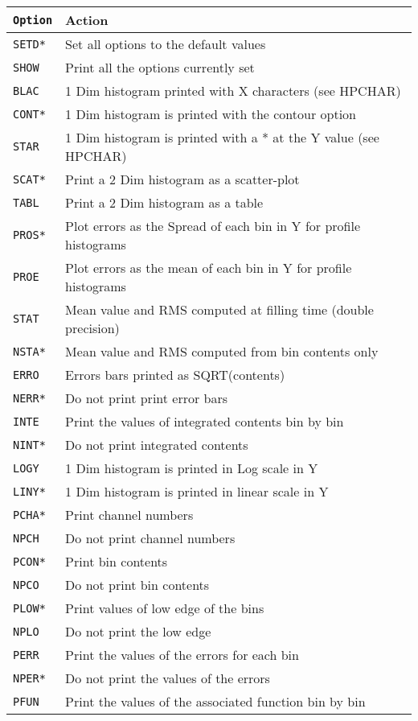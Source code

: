 \begin{Tabhere}
\begin{center}
\begin{tabular}{|>{\tt}l|p{10cm}|}
\hline {\rm\bf Option}&{\bf Action}\\ \hline
SETD*&Set all options to the default values \\
SHOW &Print all the options currently set \\
BLAC &1 Dim histogram printed with X characters (see HPCHAR) \\
CONT*&1 Dim histogram is printed with the contour option \\
STAR &1 Dim histogram is printed with a * at the Y value (see HPCHAR) \\
SCAT*&Print a 2 Dim histogram as a scatter-plot \\
TABL &Print a 2 Dim histogram as a table \\
PROS*&Plot errors as the Spread of each bin in Y for profile histograms \\
PROE &Plot errors as the mean of each bin in Y for profile histograms \\
STAT &Mean value and RMS computed at filling time (double precision) \\
NSTA*&Mean value and RMS computed from bin contents only \\
ERRO &Errors bars printed as SQRT(contents) \\
NERR*&Do not print print error bars \\
INTE &Print the values of integrated contents bin by bin\\
NINT*&Do not print integrated contents \\
LOGY &1 Dim histogram is printed in Log scale in Y \\
LINY*&1 Dim histogram is printed in linear scale in Y \\
PCHA*&Print channel numbers \\
NPCH &Do not print channel numbers \\
PCON*&Print bin contents \\
NPCO &Do not print bin contents \\
PLOW*&Print values of low edge of the bins \\
NPLO &Do not print the low edge \\
PERR &Print the values of the errors for each bin \\
NPER*&Do not print the values of the errors \\
PFUN &Print the values of the associated function bin by bin \\

\end{tabular}
\end{center}
\end{Tabhere}
